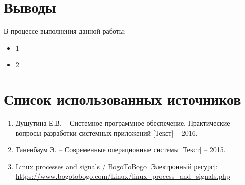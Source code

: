 \section{Выводы}

В процессе выполнения данной работы:

\begin{itemize}
	\item 1
	\item 2
\end{itemize}

\newpage

\section*{Список использованных источников}

\begin{enumerate}
	\item Душутина Е.В. -- Системное программное обеспечение. Практические вопросы разработки системных приложений [Текст] -- 2016.
	\item Таненбаум Э. -- Современные операционные системы [Текст] -- 2015.
	\item Linux processes and signals / BogoToBogo [Электронный ресурс]:\\
		{\small\url{https://www.bogotobogo.com/Linux/linux_process_and_signals.php}}
\end{enumerate}


